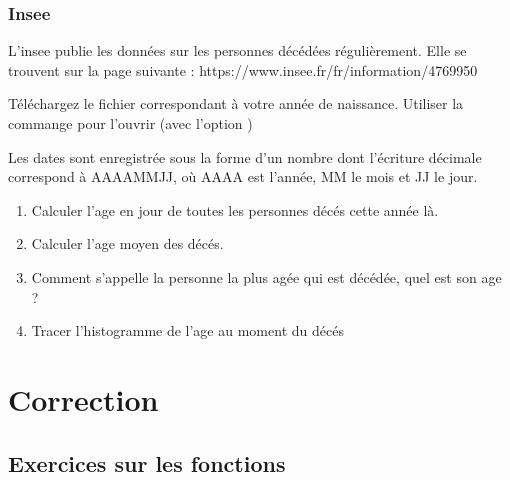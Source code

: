 \documentclass[letterpaper,10pt,english]{sphinxhowto}
\begin{document}
\subsubsection{Insee}
\label{\detokenize{devoir_maison_Devoir Maison:insee}}
\sphinxAtStartPar
L’insee publie les données sur les personnes décédées régulièrement. Elle se trouvent sur la page suivante : https://www.insee.fr/fr/information/4769950

\sphinxAtStartPar
Téléchargez le fichier correspondant à votre année de naissance. Utiliser la commange  pour l’ouvrir (avec l’option )

\sphinxAtStartPar
Les dates sont enregistrée sous la forme d’un nombre dont l’écriture décimale correspond à AAAAMMJJ, où AAAA est l’année, MM le mois et JJ le jour.
\begin{enumerate}
%
\setcounter{enumi}{15}
\item {} 
\sphinxAtStartPar
Calculer l’age en jour de toutes les personnes décés cette année là.

\item {} 
\sphinxAtStartPar
Calculer l’age moyen des décés.

\item {} 
\sphinxAtStartPar
Comment s’appelle la personne la plus agée qui est décédée, quel est son age ?

\item {} 
\sphinxAtStartPar
Tracer l’histogramme de l’age au moment du décés

\end{enumerate}

\sphinxAtStartPar
{}


\section{Correction}
\label{\detokenize{correction:correction}}\label{\detokenize{correction::doc}}

\subsection{Exercices sur les fonctions}
\label{\detokenize{cours1_fonctions_corr_exercices:exercices-sur-les-fonctions}}\label{\detokenize{cours1_fonctions_corr_exercices::doc}}
\end{document}

